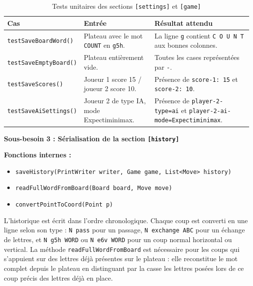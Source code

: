 \documentclass[a4paper]{article}
\begin{document}
\begin{samepage}
\begin{table}[H]
    \centering
    \small
    \begin{tabular}{p{4.5cm} p{4.5cm} p{5.5cm}}
        \toprule
        \textbf{Cas} & \textbf{Entrée} & \textbf{Résultat attendu} \\
        \midrule
        \texttt{testSaveBoardWord()} & Plateau avec le mot \texttt{COUNT} en \texttt{g5h}. & La ligne \texttt{g} contient \texttt{C O U N T} aux bonnes colonnes. \\
        \midrule
        \texttt{testSaveEmptyBoard()} & Plateau entièrement vide. & Toutes les cases représentées par \texttt{-}. \\
        \midrule
        \texttt{testSaveScores()} & Joueur 1 score 15 / joueur 2 score 10. & Présence de \texttt{score-1: 15} et \texttt{score-2: 10}. \\
        \midrule
        \texttt{testSaveAiSettings()} & Joueur 2 de type IA, mode Expectiminimax. & Présence de \texttt{player-2-type=ai} et \texttt{player-2-ai-mode=Expectiminimax}. \\
        \bottomrule
    \end{tabular}
    \caption{Tests unitaires des sections \texttt{[settings]} et \texttt{[game]}}
    
\end{table}

\newpage
\begin{besoinbox}
    \textbf{\large Sous-besoin 3 : Sérialisation de la section \texttt{[history]}}

    \vspace{2mm}
    \textbf{Fonctions internes :}
    \begin{itemize}
        \item \texttt{saveHistory(PrintWriter writer, Game game, List<Move> history)}
        \item \texttt{readFullWordFromBoard(Board board, Move move)}
        \item \texttt{convertPointToCoord(Point p)}
    \end{itemize}
    \vspace{2mm}

    L'historique est écrit dans l'ordre chronologique. Chaque coup est converti en une ligne selon son type : \texttt{N pass} pour un passage, \texttt{N exchange ABC} pour un échange de lettres, et \texttt{N g5h WORD} ou \texttt{N e6v WORD} pour un coup normal horizontal ou vertical. La méthode \texttt{readFullWordFromBoard} est nécessaire pour les coups qui s'appuient sur des lettres déjà présentes sur le plateau : elle reconstitue le mot complet depuis le plateau en distinguant par la casse les lettres posées lors de ce coup précis des lettres déjà en place.
\end{besoinbox}


\end{samepage}
\end{document}
